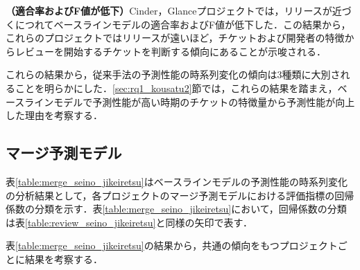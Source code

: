 \documentclass[11pt]{jreport}
\begin{document}
\textbf{（適合率およびF値が低下）}Cinder，Glanceプロジェクトでは，リリースが近づくにつれてベースラインモデルの適合率およびF値が低下した．この結果から，これらのプロジェクトではリリースが遠いほど，チケットおよび開発者の特徴からレビューを開始するチケットを判断する傾向にあることが示唆される．

これらの結果から，従来手法の予測性能の時系列変化の傾向は3種類に大別されることを明らかにした．\ref{sec:rq1_kousatu2}節では，これらの結果を踏まえ，ベースラインモデルで予測性能が高い時期のチケットの特徴量から予測性能が向上した理由を考察する．


\begin{table}[t]
\caption{各プロジェクトのレビュー予測モデルにおける評価指標の回帰係数の分類}
\label{table:review_seino_jikeiretsu}
\centering
\vspace{0.5zh}
\end{table}



\subsection{マージ予測モデル}
表\ref{table:merge_seino_jikeiretsu}はベースラインモデルの予測性能の時系列変化の分析結果として，各プロジェクトのマージ予測モデルにおける評価指標の回帰係数の分類を示す．表\ref{table:merge_seino_jikeiretsu}において，回帰係数の分類は表\ref{table:review_seino_jikeiretsu}と同様の矢印で表す．

表\ref{table:merge_seino_jikeiretsu}の結果から，共通の傾向をもつプロジェクトごとに結果を考察する．
\end{document}
